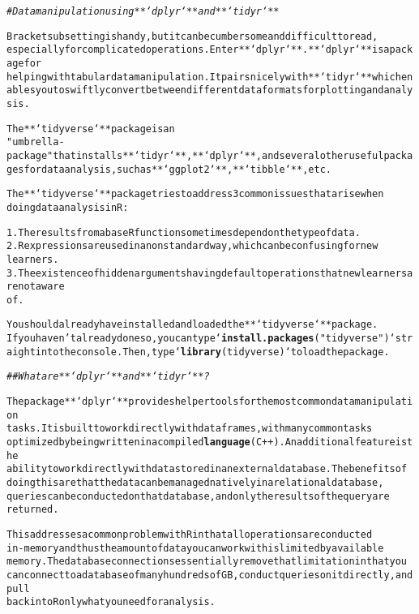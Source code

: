 \documentclass{article}\usepackage[]{graphicx}\usepackage[]{xcolor}
\makeatletter
\newcommand{\hlstr}[1]{\textcolor[rgb]{0.192,0.494,0.8}{#1}}%
\newcommand{\hlcom}[1]{\textcolor[rgb]{0.678,0.584,0.686}{\textit{#1}}}%
\newcommand{\hlkwd}[1]{\textcolor[rgb]{0.737,0.353,0.396}{\textbf{#1}}}%
\newenvironment{kframe}{%
 \def\at@end@of@kframe{}%
 \ifinner\ifhmode%
  \def\at@end@of@kframe{\end{minipage}}%
  \begin{minipage}{\columnwidth}%
 \fi\fi%
 \def\FrameCommand##1{\hskip\@totalleftmargin \hskip-\fboxsep
 \colorbox{shadecolor}{##1}\hskip-\fboxsep
     \hskip-\linewidth \hskip-\@totalleftmargin \hskip\columnwidth}%
 \MakeFramed {\advance\hsize-\width
   \@totalleftmargin\z@ \linewidth\hsize
   \@setminipage}}%
 {\par\unskip\endMakeFramed%
 \at@end@of@kframe}
\newenvironment{knitrout}{}{} %
\makeatother
\begin{document}
\begin{knitrout}
\color{fgcolor}\begin{kframe}
\begin{alltt}

\hlcom{# Data manipulation using **`dplyr`** and **`tidyr`**}

Bracket subsetting is handy, but it can be cumbersome and difficult to read,
especially for complicated operations. Enter **`dplyr`**. **`dplyr`** is a package for
helping with tabular data manipulation. It pairs nicely with **`tidyr`** which enables you to swiftly convert between different data formats for plotting and analysis.

The **`tidyverse`** package is an
\hlstr{"umbrella-package"} that installs **`tidyr`**, **`dplyr`**, and several other useful packages for data analysis, such as  **`ggplot2`**, **`tibble`**, etc.

The **`tidyverse`** package tries to address 3 common issues that arise when
doing data analysis in R:

1. The results from a base R function sometimes depend on the type of data.
2. R expressions are used in a non standard way, which can be confusing for new
   learners.
3. The existence of hidden arguments having default operations that new learners are not aware
   of.

You should already have installed and loaded the **`tidyverse`** package.
If you haven't already done so, you can type `\hlkwd{install.packages}(\hlstr{"tidyverse"})` straight into the console. Then, type `\hlkwd{library}(tidyverse)` to load the package.

\hlcom{## What are **`dplyr`** and **`tidyr`**?}

The package **`dplyr`** provides helper tools for the most common data manipulation
tasks. It is built to work directly with data frames, with many common tasks
optimized by being written in a compiled \hlkwd{language} (C++). An additional feature is the
ability to work directly with data stored in an external database. The benefits of
doing this are that the data can be managed natively in a relational database,
queries can be conducted on that database, and only the results of the query are
returned.

This addresses a common problem with R in that all operations are conducted
in-memory and thus the amount of data you can work with is limited by available
memory. The database connections essentially remove that limitation in that you
can connect to a database of many hundreds of GB, conduct queries on it directly, and pull
back into R only what you need for analysis.


\end{alltt}
\end{kframe}
\end{knitrout}
\end{document}
